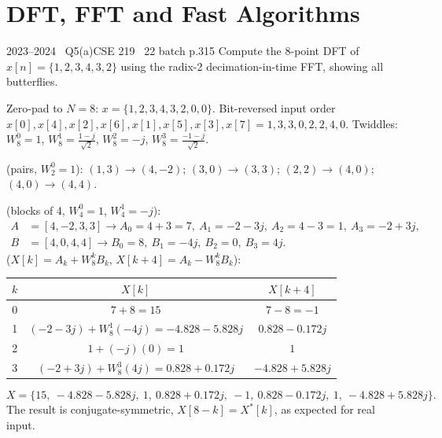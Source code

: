 \renewcommand{\teacherTag}{ASHRAF SIR \textbullet\ DFT AND FFT}
\chapter{DFT, FFT and Fast Algorithms}


\begin{qcard}{2023--2024 \textbullet\ Q5(a)}{CSE 219 \textbullet\ 22 batch p.3}{15}
Compute the 8-point DFT of $x[n]=\{1,2,3,4,3,2\}$ using the radix-2 decimation-in-time FFT, showing all butterflies.
\end{qcard}
\begin{solution}
Zero-pad to $N=8$: $x=\{1,2,3,4,3,2,0,0\}$. Bit-reversed input order $x[0],x[4],x[2],x[6],x[1],x[5],x[3],x[7]=1,3,3,0,2,2,4,0$. Twiddles: $W_8^0=1$, $W_8^1=\frac{1-j}{\sqrt2}$, $W_8^2=-j$, $W_8^3=\frac{-1-j}{\sqrt2}$.

 (pairs, $W_2^0=1$): $(1,3)\to(4,-2)$; $(3,0)\to(3,3)$; $(2,2)\to(4,0)$; $(4,0)\to(4,4)$.

 (blocks of 4, $W_4^0=1$, $W_4^1=-j$):
\begin{align*}
A&=[4,-2,3,3]\to A_0=4+3=7,\ A_1=-2-3j,\ A_2=4-3=1,\ A_3=-2+3j,\\
B&=[4,0,4,4]\to B_0=8,\ B_1=-4j,\ B_2=0,\ B_3=4j .
\end{align*}
 ($X[k]=A_k+W_8^kB_k$, $X[k+4]=A_k-W_8^kB_k$):
\begin{center}\small\renewcommand{\arraystretch}{1.2}\begin{tabular}{@{}c|c|c@{}}$k$&$X[k]$&$X[k+4]$\\\hline
0&$7+8=15$&$7-8=-1$\\
1&$(-2-3j)+W_8^1(-4j)=-4.828-5.828j$&$0.828-0.172j$\\
2&$1+(-j)(0)=1$&$1$\\
3&$(-2+3j)+W_8^3(4j)=0.828+0.172j$&$-4.828+5.828j$\end{tabular}\end{center}
\[X=\{15,\ -4.828-5.828j,\ 1,\ 0.828+0.172j,\ -1,\ 0.828-0.172j,\ 1,\ -4.828+5.828j\}.\]
The result is conjugate-symmetric, $X[8-k]=X^*[k]$, as expected for real input.
\end{solution}

